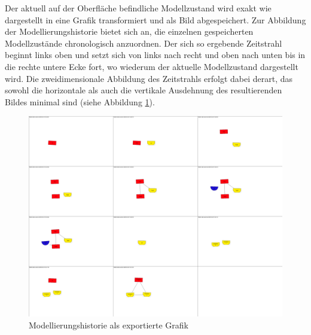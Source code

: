 Der aktuell auf der Oberfläche befindliche Modellzustand wird exakt wie dargestellt in eine Grafik transformiert und als Bild abgespeichert. Zur Abbildung der Modellierungshistorie bietet sich an, die einzelnen gespeicherten Modellzustände chronologisch anzuordnen. Der sich so ergebende Zeitstrahl beginnt links oben und setzt sich von links nach recht und oben nach unten bis in die rechte untere Ecke fort, wo wiederum der aktuelle Modellzustand dargestellt wird. Die zweidimensionale Abbildung des Zeitstrahls erfolgt dabei derart, das sowohl die horizontale als auch die vertikale Ausdehnung des resultierenden Bildes minimal sind (siehe Abbildung \ref{fig:img_Persistenz_ExportHistorie}).

\begin{figure}[htbp]
	\centering
		\includegraphics[width=15cm]{img/Persistenz/ExportHistorie.png}
	\caption{Modellierungshistorie als exportierte Grafik}
	\label{fig:img_Persistenz_ExportHistorie}
\end{figure}

